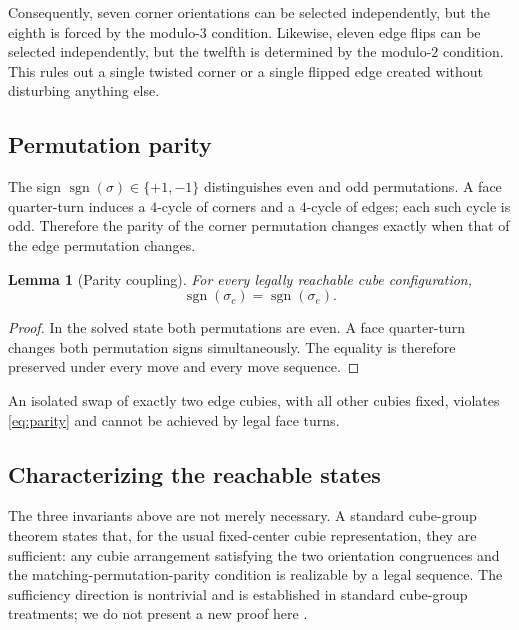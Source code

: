 \documentclass[11pt,a4paper]{article}
\newtheorem{lemma}[theorem]{Lemma}
\theoremstyle{definition}
\theoremstyle{remark}
\DeclareMathOperator{\sgn}{sgn}
\begin{document}
Consequently, seven corner orientations can be selected independently, but the eighth is forced by the modulo-$3$ condition. Likewise, eleven edge flips can be selected independently, but the twelfth is determined by the modulo-$2$ condition. This rules out a single twisted corner or a single flipped edge created without disturbing anything else.

\subsection{Permutation parity}
The sign $\sgn(\sigma)\in\{+1,-1\}$ distinguishes even and odd permutations. A face quarter-turn induces a $4$-cycle of corners and a $4$-cycle of edges; each such cycle is odd. Therefore the parity of the corner permutation changes exactly when that of the edge permutation changes.

\begin{lemma}[Parity coupling]\label{lem:parity}
For every legally reachable cube configuration,
\begin{equation}\label{eq:parity}
\sgn(\sigma_c)=\sgn(\sigma_e).
\end{equation}
\end{lemma}
\begin{proof}
In the solved state both permutations are even. A face quarter-turn changes both permutation signs simultaneously. The equality is therefore preserved under every move and every move sequence.
\end{proof}

An isolated swap of exactly two edge cubies, with all other cubies fixed, violates \cref{eq:parity} and cannot be achieved by legal face turns.

\subsection{Characterizing the reachable states}
The three invariants above are not merely necessary. A standard cube-group theorem states that, for the usual fixed-center cubie representation, they are sufficient: any cubie arrangement satisfying the two orientation congruences and the matching-permutation-parity condition is realizable by a legal sequence. The sufficiency direction is nontrivial and is established in standard cube-group treatments; we do not present a new proof here \citep{joyner2008}.
\end{document}
